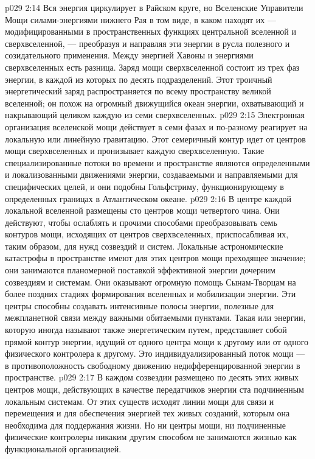 \vs p029 2:14 Вся энергия циркулирует в Райском круге, но Вселенские Управители Мощи  силами\hyp{}энергиями нижнего Рая в том виде, в каком находят их --- модифицированными в пространственных функциях центральной вселенной и сверхвселенной, --- преобразуя и направляя эти энергии в русла полезного и созидательного применения. Между энергией Хавоны и энергиями сверхвселенных есть разница. Заряд мощи сверхвселенной состоит из трех фаз энергии, в каждой из которых по десять подразделений. Этот троичный энергетический заряд распространяется по всему пространству великой вселенной; он похож на огромный движущийся океан энергии, охватывающий и накрывающий целиком каждую из семи сверхвселенных.
\vs p029 2:15 Электронная организация вселенской мощи действует в семи фазах и по\hyp{}разному реагирует на локальную или линейную гравитацию. Этот семеричный контур идет от центров мощи сверхвселенных и пронизывает каждую сверхвселенную. Такие специализированные потоки во времени и пространстве являются определенными и локализованными движениями энергии, создаваемыми и направляемыми для специфических целей, и они подобны Гольфстриму, функционирующему в определенных границах в Атлантическом океане.
\vs p029 2:16 \pc {}\bibnobreakspace {} В центре каждой локальной вселенной размещены сто центров мощи четвертого чина. Они действуют, чтобы ослаблять и прочими способами преобразовывать семь контуров мощи, исходящих от центров сверхвселенных, приспосабливая их, таким образом, для нужд созвездий и систем. Локальные астрономические катастрофы в пространстве имеют для этих центров мощи преходящее значение; они занимаются планомерной поставкой эффективной энергии дочерним созвездиям и системам. Они оказывают огромную помощь Сынам\hyp{}Творцам на более поздних стадиях формирования вселенных и мобилизации энергии. Эти центры способны создавать интенсивные полосы энергии, полезные для межпланетной связи между важными обитаемыми пунктами. Такая  или  энергии, которую иногда называют также энергетическим путем, представляет собой прямой контур энергии, идущий от одного центра мощи к другому или от одного физического контролера к другому. Это индивидуализированный поток мощи --- в противоположность свободному движению недифференцированной энергии в пространстве.
\vs p029 2:17 \pc {}\bibnobreakspace {} В каждом созвездии размещено по десять этих живых центров мощи, действующих в качестве передатчиков энергии ста подчиненным локальным системам. От этих существ исходят линии мощи для связи и перемещения и для обеспечения энергией тех живых созданий, которым она необходима для поддержания жизни. Но ни центры мощи, ни подчиненные физические контролеры никаким другим способом не занимаются жизнью как функциональной организацией.

